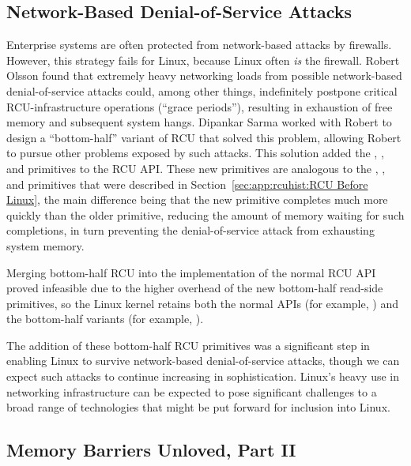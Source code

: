 \subsection{Network-Based Denial-of-Service Attacks}
\label{sec:app:rcuhist:Network-Based Denial-of-Service Attacks}

Enterprise systems are often protected from network-based attacks by
firewalls.
However, this strategy fails for Linux, because Linux often
\emph{is} the firewall.
Robert Olsson found that extremely heavy networking loads from possible
network-based denial-of-service attacks could, among other things,
indefinitely postpone critical RCU-infrastructure operations
(``grace periods''), resulting in exhaustion of free memory and
subsequent system hangs.
Dipankar Sarma worked with Robert to design a ``bottom-half''
variant of RCU that solved this problem, allowing Robert to pursue other
problems exposed by such attacks.
This solution added the
,
, and
 primitives to the RCU API.
These new primitives are analogous to the
,
, and
 primitives that were described in
Section~\ref{sec:app:rcuhist:RCU Before Linux},
the main difference being that
the new  primitive completes much more quickly
than the older  primitive, reducing the amount of
memory waiting for such completions, in turn preventing the denial-of-service
attack from exhausting system memory.

Merging bottom-half RCU into the implementation of the normal RCU API proved
infeasible due to the higher overhead of the new bottom-half
read-side primitives, so the Linux kernel retains both the normal
APIs (for example, ) and the bottom-half variants
(for example, ).

The addition of these bottom-half RCU primitives was a significant
step in enabling Linux to survive network-based denial-of-service attacks,
though we can expect such attacks to continue increasing in sophistication.
Linux's heavy use in networking infrastructure can be expected to pose
significant challenges to a broad range of technologies that might be
put forward for inclusion into Linux.

\subsection{Memory Barriers Unloved, Part II}
\label{sec:app:rcuhist:Memory Barriers Unloved, Part II}


